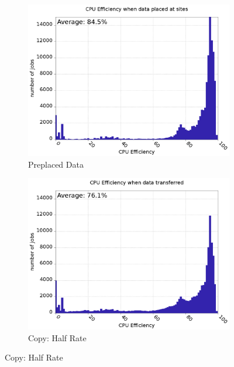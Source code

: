 \documentclass[a4paper]{jpconf}
\begin{document}
\begin{figure}
  \begin{center}
    \hspace{2.7cm}
    \begin{subfigure}{0.3\textwidth}
      \includegraphics[width=\textwidth]{figures/T_FP0_RP0CPUEff.png}
      \caption{Preplaced Data\label{fig:cpuEffToday}}
    \end{subfigure}
    \newline
    \begin{subfigure}{0.3\textwidth}
      \includegraphics[width=\textwidth]{figures/S_FM1_RP0CPUEff.png}
      \caption{Copy: Half Rate\label{fig:cpuEffCopyH}}
    \end{subfigure}

\end{center}
\end{figure}
\end{document}
